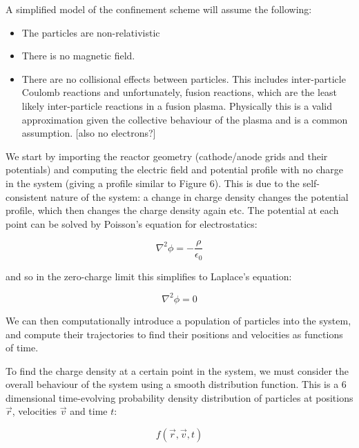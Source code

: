 \documentclass[a4paper,titlepage]{article}
\let\cite\parencite
\begin{document}
\begin{flushleft}
A simplified model of the confinement scheme will assume the following:

\begin{itemize}
    \item The particles are non-relativistic
    \item There is no magnetic field. 
    \item There are no collisional effects between particles. This includes inter-particle Coulomb reactions and unfortunately, fusion reactions, which are the least likely inter-particle reactions in a fusion plasma. Physically this is a valid approximation given the collective behaviour of the plasma and is a common assumption. \cite{freidberg_2008_plasma} 
    [also no electrons?]
\end{itemize}

We start by importing the reactor geometry (cathode/anode grids and their potentials) and computing the electric field and potential profile with no charge in the system (giving a profile similar to Figure 6). This is due to the self-consistent nature of the system: a change in charge density changes the potential profile, which then changes the charge density again etc. The potential at each point can be solved by Poisson's equation for electrostatics: 

\begin{equation}
    \nabla^2\phi = -\frac{\rho}{\epsilon_0}
    \label{poisson}
\end{equation} 

and so in the zero-charge limit this simplifies to Laplace's equation:

\begin{equation}
    \nabla^2\phi = 0
\end{equation} 

We can then computationally introduce a population of particles into the system, and compute their trajectories to find their positions and velocities as functions of time. 

To find the charge density at a certain point in the system, we must consider the overall behaviour of the system using a smooth distribution function. This is a 6 dimensional time-evolving probability density distribution of particles at positions $\vec{r}$, velocities $\vec{v}$ and time $t$:

\begin{equation}
    f(\vec{r}, \vec{v}, t)
\end{equation}


\end{flushleft}
\end{document}
